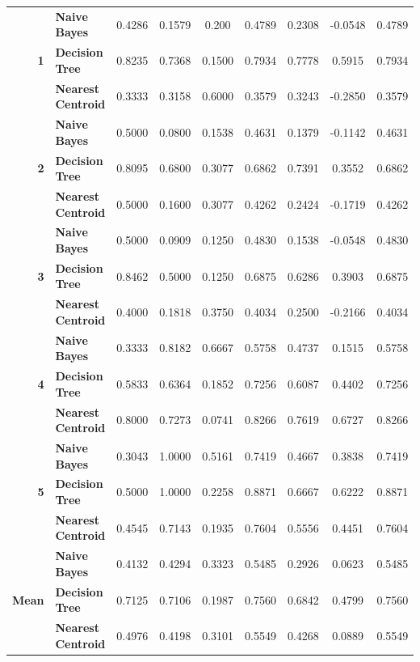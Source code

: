 \begin{center}
\begin{longtable}{ | r  l | c | c | c | c | c | c | c | }
\multirow{3}{*}{\textbf{1}} & \textbf{Naive Bayes} & 
0.4286 & 0.1579 & 0.200  & 0.4789 & 0.2308 & -0.0548 & 0.4789 \\
& \textbf{Decision Tree} & 
0.8235 & 0.7368 & 0.1500 & 0.7934 & 0.7778 &  0.5915 & 0.7934 \\
& \textbf{Nearest Centroid} &
0.3333 & 0.3158 & 0.6000 & 0.3579 & 0.3243 & -0.2850 & 0.3579 \\
\hline
\multirow{3}{*}{\textbf{2}} & \textbf{Naive Bayes} & 
0.5000 & 0.0800 & 0.1538 & 0.4631 & 0.1379 & -0.1142 & 0.4631 \\
& \textbf{Decision Tree} & 
0.8095 & 0.6800 & 0.3077 & 0.6862 & 0.7391 &  0.3552 & 0.6862 \\
& \textbf{Nearest Centroid} &
0.5000 & 0.1600 & 0.3077 & 0.4262 & 0.2424 & -0.1719 & 0.4262 \\
\hline
\multirow{3}{*}{\textbf{3}} & \textbf{Naive Bayes} & 
0.5000 & 0.0909 & 0.1250 & 0.4830 & 0.1538 & -0.0548 & 0.4830 \\
& \textbf{Decision Tree} & 
0.8462 & 0.5000 & 0.1250 & 0.6875 & 0.6286 &  0.3903 & 0.6875  \\
& \textbf{Nearest Centroid} &
0.4000 & 0.1818 & 0.3750 & 0.4034 & 0.2500 & -0.2166 & 0.4034 \\
\hline
\multirow{3}{*}{\textbf{4}} & \textbf{Naive Bayes} & 
0.3333 & 0.8182 & 0.6667 & 0.5758 & 0.4737 & 0.1515 & 0.5758 \\
& \textbf{Decision Tree} & 
0.5833 & 0.6364 & 0.1852 & 0.7256 & 0.6087 & 0.4402 & 0.7256 \\
& \textbf{Nearest Centroid} &
0.8000 & 0.7273 & 0.0741 & 0.8266 & 0.7619 & 0.6727 & 0.8266 \\
\hline
\multirow{3}{*}{\textbf{5}} & \textbf{Naive Bayes} & 
0.3043 & 1.0000 & 0.5161 & 0.7419 & 0.4667 & 0.3838 & 0.7419 \\
& \textbf{Decision Tree} & 
0.5000 & 1.0000 & 0.2258 & 0.8871 & 0.6667 & 0.6222 & 0.8871 \\
& \textbf{Nearest Centroid} &
0.4545 & 0.7143 & 0.1935 & 0.7604 & 0.5556 & 0.4451 & 0.7604 \\
\hline
\hline
\multirow{3}{*}{\textbf{Mean}} & \textbf{Naive Bayes} & 
0.4132 & 0.4294 & 0.3323 & 0.5485 & 0.2926 & 0.0623 & 0.5485 \\
& \textbf{Decision Tree} & 
0.7125 & 0.7106 & 0.1987 & 0.7560 & 0.6842 & 0.4799 & 0.7560 \\
& \textbf{Nearest Centroid} &
0.4976 & 0.4198 & 0.3101 & 0.5549 & 0.4268 & 0.0889 & 0.5549 \\
\hline
\end{longtable}
\end{center}

